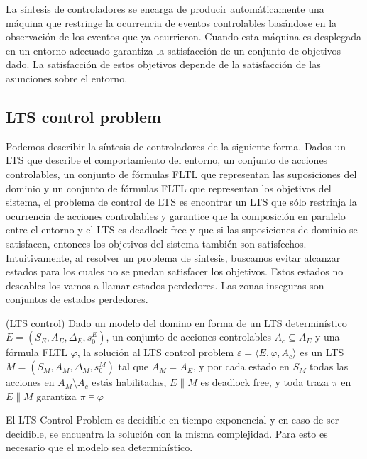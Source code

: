 La síntesis de controladores se encarga de producir automáticamente una máquina que restringe la ocurrencia de eventos 
controlables basándose en la observación de los eventos que ya ocurrieron. Cuando esta máquina es desplegada en un entorno 
adecuado garantiza la satisfacción de un conjunto de objetivos dado. La satisfacción de estos objetivos depende de la 
satisfacción de las asunciones sobre el entorno.

\subsection{LTS control problem}

Podemos describir la síntesis de controladores de la siguiente forma. Dados un LTS que describe el comportamiento 
del entorno, un conjunto de acciones controlables, un conjunto de fórmulas FLTL que representan las suposiciones 
del dominio y un conjunto de fórmulas FLTL que representan los objetivos del sistema, el problema de control de 
LTS \cite{LTSControl} es encontrar un LTS que sólo restrinja la ocurrencia de acciones controlables y garantice que la composición 
en paralelo entre el entorno y el LTS es deadlock free y que si las suposiciones de dominio se satisfacen, entonces 
los objetivos del sistema también son satisfechos. Intuitivamente, al resolver un problema de síntesis, buscamos evitar alcanzar 
estados para los cuales no se puedan satisfacer los objetivos. Estos estados no deseables los vamos a llamar estados perdedores. 
Las zonas inseguras son conjuntos de estados perdedores.

\begin{definition}{(LTS control)}
Dado un modelo del domino en forma de un LTS determinístico $E = (S_{E}, A_{E}, \Delta_{E}, s_{0}^{E})$, un conjunto de 
acciones controlables $A_{c} \subseteq A_{E}$ y una fórmula FLTL $\varphi$, la solución al LTS control problem 
$\varepsilon = \langle E, \varphi, A_{c} \rangle$ es un LTS $M = (S_{M}, A_{M}, \Delta_{M}, s_{0}^{M})$ tal que 
$A_{M} = A_{E}$, y por cada estado en $S_{M}$ todas las acciones en $A_{M} \setminus A_{c}$ estás habilitadas, $E \parallel M$ 
es deadlock free, y toda traza $\pi$ en $E \parallel M$ garantiza $\pi \vDash \varphi$
\end{definition}

El LTS Control Problem es decidible en tiempo exponencial y en caso de ser decidible, se encuentra la solución con la 
misma complejidad. Para esto es necesario que el modelo sea determinístico.

